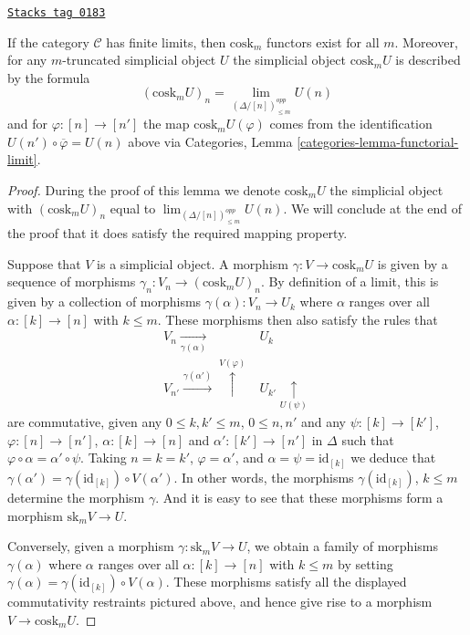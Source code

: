 \begin{lemma}
\label{simplicial-lemma-existence-cosk}
\href{https://stacks.math.columbia.edu/tag/0183}{\texttt{Stacks tag 0183}}

If the category $\mathcal{C}$ has finite limits, then
$\text{cosk}_m$ functors exist for all $m$. Moreover,
for any $m$-truncated simplicial object $U$ the
simplicial object $\text{cosk}_mU$ is described
by the formula
$$
(\text{cosk}_mU)_n = \lim_{(\Delta/[n])_{\leq m}^{opp}} U(n)
$$
and for $\varphi : [n] \to [n']$ the map
$\text{cosk}_mU(\varphi)$ comes from the
identification $U(n') \circ \overline{\varphi} = U(n)$ above
via Categories, Lemma \ref{categories-lemma-functorial-limit}.
\end{lemma}

\begin{proof}
During the proof of this lemma we denote $\text{cosk}_mU$ the
simplicial object with $(\text{cosk}_mU)_n$ equal to
$\lim_{(\Delta/[n])_{\leq m}^{opp}} U(n)$.
We will conclude at the end of the proof that it does
satisfy the required mapping property.

\medskip\noindent
Suppose that $V$ is a simplicial object.
A morphism $\gamma : V \to \text{cosk}_mU$ is given by a sequence
of morphisms $\gamma_n : V_n \to (\text{cosk}_mU)_n$.
By definition of a limit, this is given by a
collection of morphisms $\gamma(\alpha) : V_n \to U_k$
where $\alpha$ ranges over all $\alpha : [k] \to [n]$
with $k \leq m$. These morphisms then also satisfy
the rules that
$$
\begin{array}{cc}V_n \underset{\gamma(\alpha)}{\longrightarrow} & U_k \\ V_{n'} \overset{\gamma(\alpha')}{\longrightarrow}\overset{V(\varphi)}{\uparrow} & U_{k'} \underset{U(\psi)}{\uparrow}\end{array}
$$
are commutative, given any $0 \leq k, k' \leq m$, $0 \leq n, n'$
and any $\psi : [k] \to [k']$, $\varphi : [n] \to [n']$,
$\alpha : [k] \to [n]$ and $\alpha' : [k'] \to [n']$ in $\Delta$
such that $\varphi \circ \alpha = \alpha' \circ \psi$.
Taking $n = k = k'$, $\varphi = \alpha'$, and $\alpha = \psi = \text{id}_{[k]}$
we deduce that $\gamma(\alpha') = \gamma(\text{id}_{[k]}) \circ V(\alpha')$.
In other words, the morphisms $\gamma(\text{id}_{[k]})$, $k \leq m$
determine the morphism $\gamma$. And it is easy to see that these
morphisms form a morphism $\text{sk}_m V \to U$.

\medskip\noindent
Conversely, given a morphism $\gamma : \text{sk}_m V \to U$,
we obtain a family of morphisms $\gamma(\alpha)$
where $\alpha$ ranges over all $\alpha : [k] \to [n]$
with $k \leq m$ by setting $\gamma(\alpha) =
\gamma(\text{id}_{[k]}) \circ V(\alpha)$. These morphisms
satisfy all the displayed commutativity restraints pictured
above, and hence give rise to a morphism $V \to \text{cosk}_m U$.
\end{proof}

